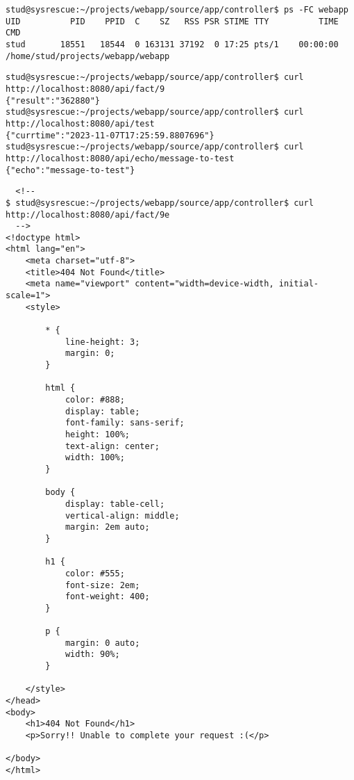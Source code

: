 \begin{verbatim}
stud@sysrescue:~/projects/webapp/source/app/controller$ ps -FC webapp
UID          PID    PPID  C    SZ   RSS PSR STIME TTY          TIME CMD
stud       18551   18544  0 163131 37192  0 17:25 pts/1    00:00:00 /home/stud/projects/webapp/webapp
\end{verbatim}

\begin{verbatim}
stud@sysrescue:~/projects/webapp/source/app/controller$ curl http://localhost:8080/api/fact/9
{"result":"362880"}
stud@sysrescue:~/projects/webapp/source/app/controller$ curl http://localhost:8080/api/test
{"currtime":"2023-11-07T17:25:59.8807696"}
stud@sysrescue:~/projects/webapp/source/app/controller$ curl http://localhost:8080/api/echo/message-to-test
{"echo":"message-to-test"}
\end{verbatim}

\begin{verbatim}
  <!--
$ stud@sysrescue:~/projects/webapp/source/app/controller$ curl http://localhost:8080/api/fact/9e
  -->
<!doctype html>
<html lang="en">
    <meta charset="utf-8">
    <title>404 Not Found</title>
    <meta name="viewport" content="width=device-width, initial-scale=1">
    <style>

        * {
            line-height: 3;
            margin: 0;
        }

        html {
            color: #888;
            display: table;
            font-family: sans-serif;
            height: 100%;
            text-align: center;
            width: 100%;
        }

        body {
            display: table-cell;
            vertical-align: middle;
            margin: 2em auto;
        }

        h1 {
            color: #555;
            font-size: 2em;
            font-weight: 400;
        }

        p {
            margin: 0 auto;
            width: 90%;
        }

    </style>
</head>
<body>
    <h1>404 Not Found</h1>
    <p>Sorry!! Unable to complete your request :(</p>

</body>
</html>
\end{verbatim}





